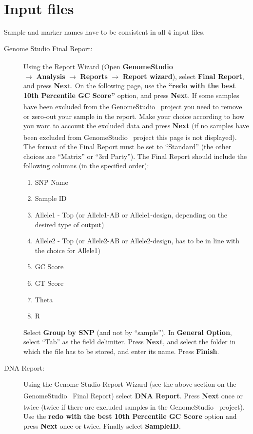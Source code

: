 \documentclass[a4paper,11pt,english]{article}
\newcommand{\reg}{\textsuperscript{\textregistered}}
\begin{document}
\section{Input files}
\label{index:input-files}
Sample and marker names have to be consistent in all 4 input files.
\begin{description}
 \item [Genome Studio Final Report:]
Using the Report Wizard (Open \textbf{GenomeStudio\reg}\\ $\rightarrow$ \textbf{Analysis}
$\rightarrow$ \textbf{Reports} $\rightarrow$ \textbf{Report wizard}), select \textbf{Final
Report}, and press \textbf{Next}. On the following page, use the \textbf{``redo with the best 10th
Percentile GC Score''}
option, and
press \textbf{Next}. If some samples have been excluded from the GenomeStudio\reg~ project you
need
to remove
or zero-out your sample in the report. Make your choice according to how you want to account 
the excluded data and press \textbf{Next} (if no samples have been excluded from GenomeStudio\reg~
project this page is not displayed).
The format of the Final  Report must be set to ``Standard'' (the other choices are ``Matrix''
or ``3rd Party''). The Final Report should include the following columns (in the specified order):
\begin{enumerate}
\item SNP Name
\item Sample ID
\item Allele1 - Top (or Allele1-AB or Allele1-design, depending on the desired type of output)
\item Allele2 - Top (or Allele2-AB or Allele2-design, has to be in line with the choice for
Allele1)
\item GC Score
\item GT Score
\item Theta
\item R
\end{enumerate}

Select \textbf{Group by SNP} (and not by ``sample''). In \textbf{General Option}, select ``Tab'' as
the field delimiter.
Press \textbf{Next}, and select the folder in which the file has to be stored, and enter its name.
Press \textbf{Finish}.

\item [DNA Report:]
Using the Genome Studio Report Wizard (see the above section on the GenomeStudio\reg~  Final Report)
select  \textbf{DNA Report}. Press  \textbf{Next} once or twice (twice if there are excluded samples
in the GenomeStudio\reg~  project). Use the \textbf{redo with the best 10th Percentile GC Score}
option and press  \textbf{Next} once or twice. Finally select \textbf{SampleID}.


\end{description}
\end{document}
